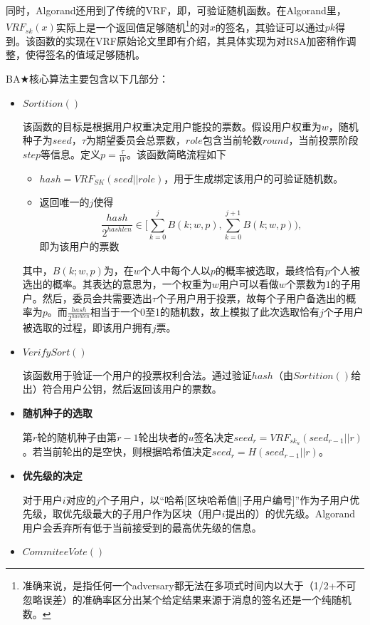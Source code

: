 同时，Algorand还用到了传统的VRF，即，可验证随机函数。在Algorand里，$VRF_{sk}(x)$实际上是一个返回值足够随机\footnote{准确来说，是指任何一个adversary都无法在多项式时间内以大于（1/2+不可忽略误差）的准确率区分出某个给定结果来源于消息的签名还是一个纯随机数。}的对$x$的签名，其验证可以通过$pk$得到。该函数的实现在VRF原始论文里即有介绍\cite{micali1999verifiable}，其具体实现为对RSA加密稍作调整，使得签名的值域足够随机。

BA$\bigstar$核心算法主要包含以下几部分：
\begin{itemize}
	\item $Sortition()$
	
	该函数的目标是根据用户权重决定用户能投的票数。假设用户权重为$w$，随机种子为$seed$，$\tau$为期望委员会总票数，$role$包含当前轮数$round$，当前投票阶段$step$等信息。定义$p=\frac{\tau}{W}$。该函数简略流程如下
	\begin{itemize}
		\item $hash= VRF_{SK}(seed||role)$，用于生成绑定该用户的可验证随机数。
		\item 返回唯一的$j$使得
		$$\frac{hash}{2^{hashlen}} \in [\sum_{k=0}^j B(k;w,p),\sum_{k=0}^{j+1}B(k;w,p)),$$即为该用户的票数
	\end{itemize}
	其中，$B(k;w,p)$为，在$w$个人中每个人以$p$的概率被选取，最终恰有$p$个人被选出的概率。其表达的意思为，一个权重为$w$用户可以看做$w$个票数为$1$的子用户。然后，委员会共需要选出$\tau$个子用户用于投票，故每个子用户备选出的概率为$p$。而$\frac{hash}{2^{hashlen}}$相当于一个0至1的随机数，故上模拟了此次选取恰有$j$个子用户被选取的过程，即该用户拥有$j$票。
		
	\item $VerifySort()$
	
	该函数用于验证一个用户的投票权利合法。通过验证$hash$（由$Sortition()$给出）符合用户公钥，然后返回该用户的票数。
	
	\item \textbf{随机种子的选取}
	
	第$r$轮的随机种子由第$r-1$轮出块者的$u$签名决定$seed_r=VRF_{sk_u}(seed_{r-1}||r)$。若当前轮出的是空快，则根据哈希值决定$seed_r=H(seed_{r-1}||r)$。
	
	\item \textbf{优先级的决定}
	
	对于用户$i$对应的$j$个子用户，以“哈希[区块哈希值||子用户编号]”作为子用户优先级，取优先级最大的子用户作为区块（用户$i$提出的）的优先级。Algorand用户会丢弃所有低于当前接受到的最高优先级的信息。
	
	\item $CommiteeVote()$
	

\end{itemize}
